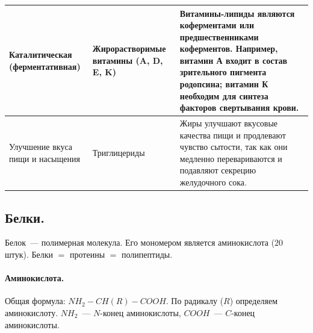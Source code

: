\documentclass[12pt]{article}
\begin{document}
\begin{xltabular}{\textwidth}{|X|X|X|}
		\hline
		Каталитическая (ферментативная)	& Жирорастворимые витамины (A, D, E, K) & Витамины-липиды являются коферментами или предшественниками коферментов. Например, витамин А входит в состав зрительного пигмента родопсина; витамин К необходим для синтеза факторов свертывания крови. \\
		\hline
		Улучшение вкуса пищи и насыщения & Триглицериды & Жиры улучшают вкусовые качества пищи и продлевают чувство сытости, так как они медленно перевариваются и подавляют секрецию желудочного сока. \\
		\hline
	\end{xltabular}
	\subsection{Белки.}
	Белок~--- полимерная молекула. Его мономером является аминокислота ($20$ штук). Белки $=$ протеины $=$ полипептиды.
	\paragraph{Аминокислота.} Общая формула: $NH_2 - CH (R) - COOH$. По радикалу ($R$) определяем аминокислоту. $NH_2$~--- $N$-конец аминокислоты, $COOH$~--- $C$-конец аминокислоты. \\
\end{document}
